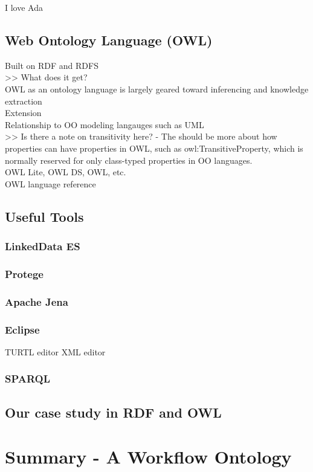 I love Ada

\subsection{Web Ontology Language (OWL)}

Built on RDF and RDFS\\
>> What does it get?\\
OWL as an ontology language is largely geared toward inferencing and knowledge
extraction\\
Extension\\
Relationship to OO modeling langauges such as UML\\
>> Is there a note on transitivity here? - The should be more about how
properties can have properties in OWL, such as owl:TransitiveProperty, which is
normally reserved for only class-typed properties in OO languages.\\
OWL Lite, OWL DS, OWL, etc.\\
OWL language reference\\

\subsection{Useful Tools}

\subsubsection{LinkedData ES}
\subsubsection{Protege}
\subsubsection{Apache Jena}
\subsubsection{Eclipse}
TURTL editor
XML editor
\subsubsection{SPARQL}

\subsection{Our case study in RDF and OWL}

\section{Summary - A Workflow Ontology}

